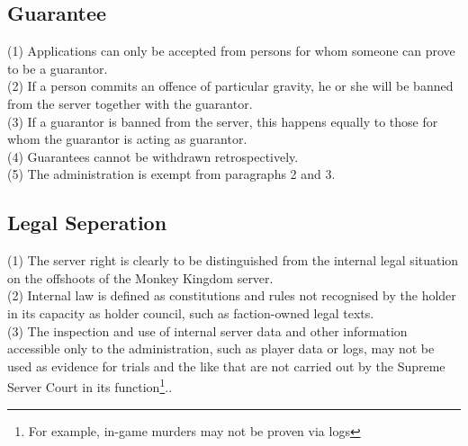 \documentclass{article}
\begin{document}
\subsection{Guarantee}
(1) Applications can only be accepted from persons for whom someone can prove to be a guarantor.\\
(2) If a person commits an offence of particular gravity, he or she will be banned from the server together with the guarantor.\\
(3) If a guarantor is banned from the server, this happens equally to those for whom the guarantor is acting as guarantor.\\
(4) Guarantees cannot be withdrawn retrospectively.\\
(5) The administration is exempt from paragraphs 2 and 3.

\subsection{Legal Seperation}
(1) The server right is clearly to be distinguished from the internal legal situation on the offshoots of the Monkey Kingdom server.\\
(2) Internal law is defined as constitutions and rules not recognised by the holder in its capacity as holder council, such as faction-owned legal texts.\\
(3) The inspection and use of internal server data and other information accessible only to the administration, such as player data or logs, may not be used as evidence for trials and the like that are not carried out by the Supreme Server Court in its function\footnote{For example, in-game murders may not be proven via logs}..
\end{document}
